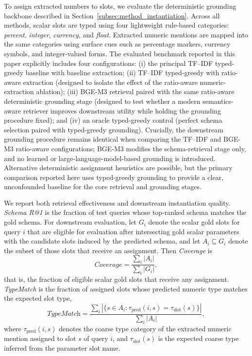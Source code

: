 \documentclass[3p]{elsarticle}
\begin{document}
To assign extracted numbers to slots, we evaluate the deterministic grounding backbone described in Section~\ref{subsec:method_instantiation}. Across all methods, scalar slots are typed using four lightweight rule-based categories: \emph{percent}, \emph{integer}, \emph{currency}, and \emph{float}. Extracted numeric mentions are mapped into the same categories using surface cues such as percentage markers, currency symbols, and integer-valued forms. The evaluated benchmark reported in this paper explicitly includes four configurations: (i) the principal TF--IDF typed-greedy baseline with baseline extraction; (ii) TF--IDF typed-greedy with ratio-aware extraction (designed to isolate the effect of the ratio-aware numeric-extraction ablation); (iii) BGE-M3 retrieval paired with the same ratio-aware deterministic grounding stage (designed to test whether a modern semantics-aware retriever improves downstream utility while holding the grounding procedure fixed); and (iv) an oracle typed-greedy control (perfect schema selection paired with typed-greedy grounding). Crucially, the downstream grounding procedure remains identical when comparing the TF--IDF and BGE-M3 ratio-aware configurations; BGE-M3 modifies the schema-retrieval stage only, and no learned or large-language-model-based grounding is introduced. Alternative deterministic assignment heuristics are possible, but the primary comparison reported here uses typed-greedy grounding to provide a clear, unconfounded baseline for the core retrieval and grounding stages.

We report both retrieval effectiveness and downstream instantiation quality. \textit{Schema R@1} is the fraction of test queries whose top-ranked schema matches the gold schema. For downstream evaluation, let $G_i$ denote the scalar gold slots for query $i$ that are eligible for evaluation after intersecting gold scalar parameters with the candidate slots induced by the predicted schema, and let $A_i \subseteq G_i$ denote the subset of those slots that receive an assignment. Then \textit{Coverage} is
\begin{equation}
\textit{Coverage}
=
\frac{\sum_i |A_i|}{\sum_i |G_i|},
\label{eq:coverage}
\end{equation}
that is, the fraction of eligible scalar gold slots that receive any assignment. \textit{TypeMatch} is the fraction of assigned slots whose predicted numeric type matches the expected slot type,
\begin{equation}
\textit{TypeMatch}
=
\frac{\sum_i |\{s \in A_i : \tau_{\mathrm{pred}}(i,s) = \tau_{\mathrm{slot}}(s)\}|}{\sum_i |A_i|},
\label{eq:typematch}
\end{equation}
where $\tau_{\mathrm{pred}}(i,s)$ denotes the coarse type category of the extracted numeric mention assigned to slot $s$ of query $i$, and $\tau_{\mathrm{slot}}(s)$ is the expected coarse type inferred from the parameter slot name.
\end{document}
